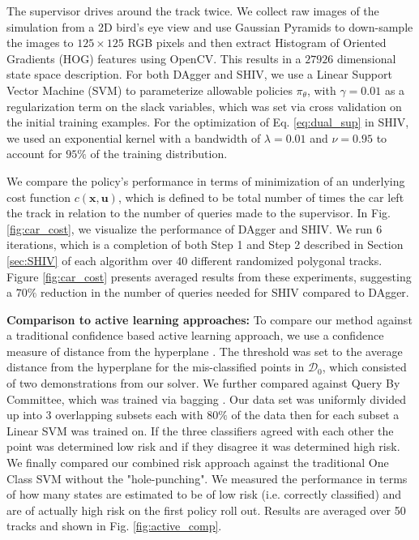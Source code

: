 \documentclass[10pt, conference]{ieeeconf}      %
\newcommand{\bu}{\mathbf{u}}
\newcommand{\bx}{\mathbf{x}}
\newcommand{\acro}{SHIV}
\begin{document}
The supervisor drives around the track twice. We collect raw images of the simulation from a 2D bird's eye view
and use Gaussian Pyramids to down-sample the images to $125 \times 125$ RGB pixels and then extract Histogram of
Oriented Gradients (HOG) features using OpenCV. This results in a $27926$ dimensional state space description.
For both DAgger and \acro, we use a Linear Support Vector Machine (SVM) to parameterize allowable
policies $\pi_{\theta}$, with $\gamma=0.01$ as a regularization term on the slack variables, which was set via cross
validation on the initial training examples. For the optimization of Eq. \ref{eq:dual_sup} in \acro, we used an
exponential kernel with a bandwidth of $\lambda=0.01$ and $\nu = 0.95$ to account for $95\%$ of the training distribution. 




We compare the policy's performance in terms of minimization of an underlying cost function $c(\bx,\bu)$, which is
defined to be total number of times the car left the track in relation to the number of queries made to the supervisor.
In Fig. \ref{fig:car_cost}, we visualize the performance of DAgger and SHIV.  We run 6 iterations, which is a completion of both Step 1 and Step 2 described in Section \ref{sec:SHIV} of each algorithm over 40 different
randomized polygonal tracks. Figure \ref{fig:car_cost} presents averaged
results from these experiments, suggesting a $70\%$ reduction in the number of queries needed for SHIV compared to DAgger. 
 
\textbf{Comparison to active learning approaches:}
To compare our method against a traditional confidence based active learning approach, we use a confidence measure  of distance from the hyperplane \cite{tong2002support}. The threshold was set to the average distance from the hyperplane for the mis-classified points in $\mathcal{D}_0$, which consisted of two demonstrations from our solver. We further compared against Query By Committee, which was trained via bagging \cite{breiman1996bagging}. Our data set was uniformly divided up into 3 overlapping subsets each with $80\%$ of the data then for each subset a Linear SVM was trained on. If the three classifiers agreed with each other the point was determined low risk and if they disagree it was determined high risk. We finally compared our combined risk approach against the traditional One Class SVM without the "hole-punching". We measured the performance in terms of how many states are estimated to be of low risk (i.e. correctly classified) and are of actually high risk on the first policy roll out. Results  are averaged over 50 tracks and shown in Fig. \ref{fig:active_comp}. 
\end{document}
